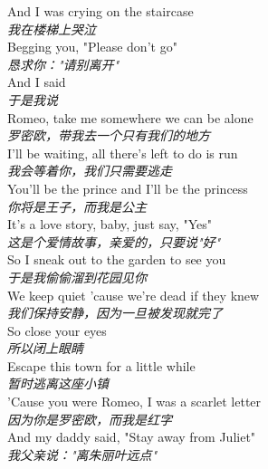 \begin{spacing}{1.5}
\begin{flushleft}
And I was crying on the staircase\\
\textit{我在楼梯上哭泣}\\[0.5em]

Begging you, "Please don't go"\\
\textit{恳求你："请别离开"}\\[0.5em]

And I said\\
\textit{于是我说}\\[0.5em]

Romeo, take me somewhere we can be alone\\
\textit{罗密欧，带我去一个只有我们的地方}\\[0.5em]

I'll be waiting, all there's left to do is run\\
\textit{我会等着你，我们只需要逃走}\\[0.5em]

You'll be the prince and I'll be the princess\\
\textit{你将是王子，而我是公主}\\[0.5em]

It's a love story, baby, just say, "Yes"\\
\textit{这是个爱情故事，亲爱的，只要说"好"}\\[0.5em]

So I sneak out to the garden to see you\\
\textit{于是我偷偷溜到花园见你}\\[0.5em]

We keep quiet 'cause we're dead if they knew\\
\textit{我们保持安静，因为一旦被发现就完了}\\[0.5em]

So close your eyes\\
\textit{所以闭上眼睛}\\[0.5em]

Escape this town for a little while\\
\textit{暂时逃离这座小镇}\\[0.5em]

'Cause you were Romeo, I was a scarlet letter\\
\textit{因为你是罗密欧，而我是红字}\\[0.5em]

And my daddy said, "Stay away from Juliet"\\
\textit{我父亲说："离朱丽叶远点"}\\[0.5em]


\end{flushleft}
\end{spacing}
